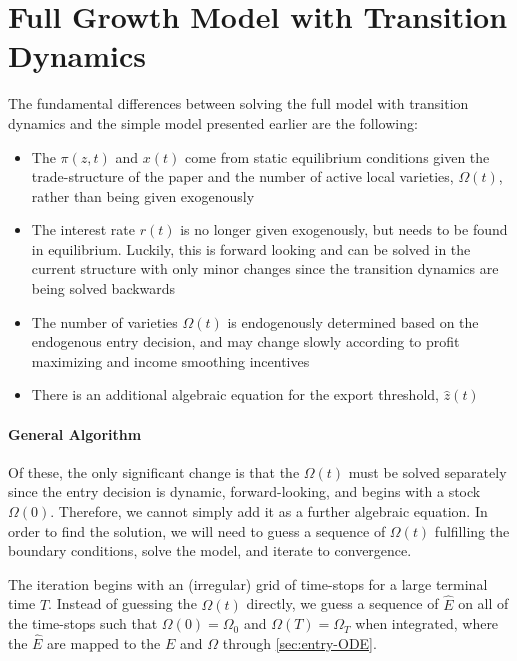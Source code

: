 \documentclass[11pt]{article}
\begin{document}
\section{Full Growth Model with Transition Dynamics}
The fundamental differences between solving the full model with transition dynamics and the simple model presented earlier are the following:
\begin{itemize}
	\item The $\pi(z,t)$ and $x(t)$ come from static equilibrium conditions given the trade-structure of the paper and the number of active local varieties, $\Omega(t)$, rather than being given exogenously
	\item The interest rate $r(t)$ is no longer given exogenously, but needs to be found in equilibrium.  Luckily, this is forward looking and can be solved in the current structure with only minor changes since the transition dynamics are being solved backwards
	\item The number of varieties $\Omega(t)$ is endogenously determined based on the endogenous entry decision, and may change slowly according to profit maximizing and income smoothing incentives
	\item There is an additional algebraic equation for the export threshold, $\hat{z}(t)$
\end{itemize}

\paragraph{General Algorithm}
Of these, the only significant change is that the $\Omega(t)$ must be solved separately since the entry decision is dynamic, forward-looking, and begins with a stock $\Omega(0)$.  Therefore, we cannot simply add it as a further algebraic equation.  In order to find the solution, we will need to guess a sequence of $\Omega(t)$ fulfilling the boundary conditions, solve the model, and iterate to convergence.

The iteration begins with an (irregular) grid of time-stops for a large terminal time $T$.  Instead of guessing the $\Omega(t)$ directly, we guess a sequence of $\hat{E}$ on all of the time-stops such that $\Omega(0) = \Omega_0$ and $\Omega(T) = \Omega_T$ when integrated, where the $\hat{E}$ are mapped to the $E$ and $\Omega$ through \cref{sec:entry-ODE}.
\end{document}
